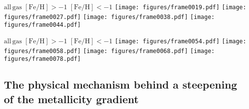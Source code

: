 \documentclass[useAMS,usenatbib]{mnras}
\begin{document}
\begin{figure*}
    \begin{centering}
    \hspace*{.5em} $\mathrm{all\, gas}$ \hspace*{12.5em} $\mathrm{[Fe/H]}>-1$ \hspace*{12.em} $\mathrm{[Fe/H]}<-1$ 
     \texttt{[image: figures/frame0019.pdf]}
     \texttt{[image: figures/frame0027.pdf]}
     \texttt{[image: figures/frame0038.pdf]}
     \texttt{[image: figures/frame0044.pdf]}
     \vspace*{-1.em}
     \caption{
      Visualization of the cold gas surface density in galaxy g2.79e12 during the merger phase ($1.99\, \mathrm{Gyr} < t < 5.10\, \mathrm{Gyr}$; top to bottom, continued in Fig.~\ref{fig:visu2}) where the cold gas half mass radius sharply increases. From left to right we show the total cold gas surface density, the enriched ($\mathrm{[Fe/H]}>-1$) cold gas surface density and the unenriched cold gas ($\mathrm{[Fe/H]}<-1$). In the upper right corner of each panel we show the time and redshift.     
     }
     \label{fig:visu}
    \end{centering}
\end{figure*}

\begin{figure*}
    \begin{centering}
    \hspace*{.5em} $\mathrm{all\, gas}$ \hspace*{12.5em} $\mathrm{[Fe/H]}>-1$ \hspace*{12.em} $\mathrm{[Fe/H]}<-1$ 
     \texttt{[image: figures/frame0054.pdf]}
     \texttt{[image: figures/frame0058.pdf]}
     \texttt{[image: figures/frame0068.pdf]}
     \texttt{[image: figures/frame0078.pdf]}
     \vspace*{-1.em}
     \caption{
     Continuation of Fig.~\ref{fig:visu}.      
     }
     \label{fig:visu2}
    \end{centering}
\end{figure*}

\subsection{The physical mechanism behind a steepening of the metallicity gradient}
\label{sec:steepening}
\end{document}
